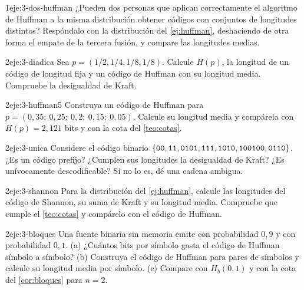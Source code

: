 \begin{ejercicio}{1}{eje:3-dos-huffman}
¿Pueden dos personas que aplican correctamente el algoritmo de Huffman a la misma distribución obtener códigos con conjuntos de longitudes distintos? Respóndalo con la distribución del \cref{ej:huffman}, deshaciendo de otra forma el empate de la tercera fusión, y compare las longitudes medias.
\end{ejercicio}

\begin{ejercicio}{2}{eje:3-diadica}
Sea $p=(1/2,1/4,1/8,1/8)$. Calcule $H(p)$, la longitud de un código de longitud fija y un código de Huffman con su longitud media. Compruebe la desigualdad de Kraft.
\end{ejercicio}

\begin{ejercicio}{2}{eje:3-huffman5}
Construya un código de Huffman para $p=(0{,}35;\ 0{,}25;\ 0{,}2;\ 0{,}15;\ 0{,}05)$. Calcule su longitud media y compárela con $H(p)=2{,}121$ bits y con la cota del \cref{teo:cotas}.
\end{ejercicio}

\begin{ejercicio}{2}{eje:3-unica}
Considere el código binario $\{\textnormal{\texttt{00}},\textnormal{\texttt{11}},\textnormal{\texttt{0101}},\textnormal{\texttt{111}},\textnormal{\texttt{1010}},\textnormal{\texttt{100100}},\textnormal{\texttt{0110}}\}$. ¿Es un código prefijo? ¿Cumplen sus longitudes la desigualdad de Kraft? ¿Es unívocamente descodificable? Si no lo es, dé una cadena ambigua.
\end{ejercicio}

\begin{ejercicio}{2}{eje:3-shannon}
Para la distribución del \cref{ej:huffman}, calcule las longitudes del código de Shannon, su suma de Kraft y su longitud media. Compruebe que cumple el \cref{teo:cotas} y compárelo con el código de Huffman.
\end{ejercicio}

\begin{ejercicio}{2}{eje:3-bloques}
Una fuente binaria sin memoria emite  con probabilidad $0{,}9$ y  con probabilidad $0{,}1$. (a) ¿Cuántos bits por símbolo gasta el código de Huffman símbolo a símbolo? (b) Construya el código de Huffman para pares de símbolos y calcule su longitud media por símbolo. (c) Compare con $H_b(0{,}1)$ y con la cota del \cref{cor:bloques} para $n=2$.
\end{ejercicio}

